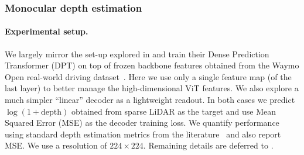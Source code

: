 \begin{table}[t]
    \caption{
      Fewshot semantic segmentation on ADE20k, when only a fraction of the training set is used.
We report mean IoU for semantic segmentation on the validation set.
Transfer is done with end-to-end fine-tuning and a linear decoder, following~\citet{strudel2021segmenter}.
We average over 3 runs.
}
\centering
\small
  \setlength{\tabcolsep}{4pt}
    \label{tab:semseg_fewshot}
\end{table}



\subsubsection{Monocular depth estimation}

\paragraph{Experimental setup.}
We largely mirror the set-up explored in \citet{ranftl2021vision} and train their Dense Prediction Transformer (DPT) on top of frozen \chonk backbone features obtained from the Waymo Open real-world driving dataset~\citep{sun2020scalability}.
Here we use only a single feature map (of the last layer) to better manage the high-dimensional ViT features.
We also explore a much simpler ``linear'' decoder as a lightweight readout.
In both cases we predict $\log(1 + \text{depth})$ obtained from sparse LiDAR as the target and use Mean Squared Error (MSE) as the decoder training loss. 
We quantify performance using standard depth estimation metrics from the literature~\citep{hermann2020self, eigen2014depth} and also report MSE. We use a resolution of $224\times224$. 
Remaining details are deferred to .


